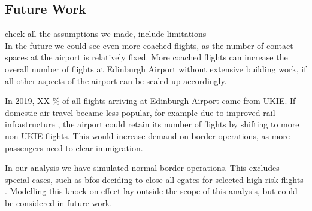 \documentclass[10pt]{article}
\begin{document}
\subsection{Future Work}
check all the assumptions we made, include limitations \\

In the future we could see even more coached flights, as the number of contact spaces at the airport is relatively fixed. More coached flights can increase the overall number of flights at Edinburgh Airport without extensive building work, if all other aspects of the airport can be scaled up accordingly.


\jbnote{}

In 2019, XX \% of all flights arriving at Edinburgh Airport came from UKIE. If domestic air travel became less popular, for example due to improved rail infrastructure \cite{train_airplane_guardian}, the airport could retain its number of flights by shifting to more non-UKIE flights. This would increase demand on border operations, as more passengers need to clear immigration. 

In our analysis we have simulated normal border operations. This excludes special cases, such as \glspl{bfo} deciding to close all \glspl{egate} for selected high-risk flights \cite{Inspection_eGates}. Modelling this knock-on effect lay outside the scope of this analysis, but could be considered in future work.


{\footnotesize
}
% 
\end{document}
